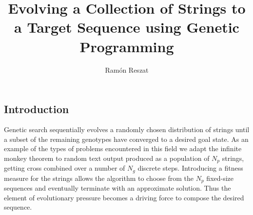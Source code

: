 \documentclass{article}
\begin{document}
	\title{Evolving a Collection of Strings to a Target Sequence using Genetic Programming}
	\author{Ramón Reszat}
	\maketitle
		\begin{multicols}{2}
		\section{Introduction}
		Genetic search sequentially evolves a randomly chosen distribution of strings until a subset of the remaining genotypes have converged to a desired goal state. As an example of the types of problems encountered in this field we adapt the infinite monkey theorem \cite{infinitemonkey} to random text output produced as a population of \(N_p\) strings, getting cross combined over a number of \(N_g\) discrete steps. Introducing a fitness measure for the strings allows the algorithm to choose from the \(N_p\) fixed-size sequences and eventually terminate with an approximate solution. Thus the element of evolutionary pressure becomes a driving force to compose the desired sequence.


\end{multicols}
\end{document}
